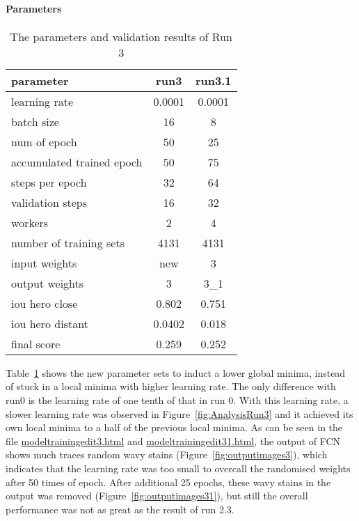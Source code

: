 \documentclass[paper=a4, fontsize=11pt]{scrartcl} %
\numberwithin{equation}{section} %
\numberwithin{figure}{section} %
\numberwithin{table}{section} %
\begin{document}
\begin{enumerate}
\begin{itemize}
{\paragraph{Parameters}\label{rubric22}
\begin{table}
	\begin{center}
		\begin{tabular}{ l | c | c }
		\hline
		parameter & run3 & run3.1 \\ \hline
		learning rate & 0.0001 & 0.0001 \\ \hline
		batch size    & 16 & 8 \\ \hline
		num of epoch  & 50 & 25 \\ \hline
		accumulated trained epoch & 50 & 75 \\ \hline
		steps per epoch & 32 & 64 \\ \hline
		validation steps & 16 & 32 \\ \hline
		workers & 2 & 4  \\ \hline
		number of training sets & 4131 & 4131 \\ \hline
		input weights & new & 3 \\ \hline
		output weights & 3 & 3\_1\\ 		
		\hline \hline
		iou hero close &0.802 & 0.751 \\ \hline	  
		iou hero distant & 0.0402 & 0.018 \\ \hline
		final score & 0.259& 0.252 \\
		\hline
		\end{tabular}
		\caption{The parameters and validation results of Run 3}
		\label{tab:parameters3}
	\end{center}
\end{table}

Table~\ref{tab:parameters3} shows the new parameter sets to induct a lower global minima, instead of stuck in a local minima with higher learning rate. The only difference with run0 is the learning rate of one tenth of that in run 0. 
With this learning rate, a slower learning rate was observed in Figure~\ref{fig:AnalysisRun3} and it achieved its own local minima to a half of the previous local minima. As can be seen in the file \href{run:./JupyterNotebooks/modeltrainingedit3.html}{modeltrainingedit3.html} and \href{run:./JupyterNotebooks/modeltrainingedit31.html}{modeltrainingedit31.html}, the output of FCN shows much traces random wavy stains (Figure~\ref{fig:outputimages3}), which indicates that the learning rate was too small to overcall the randomised weights after 50 times of epoch. After additional 25 epochs, these wavy stains in the output was removed (Figure~\ref{fig:outputimages31}), but still the overall performance was not as great as the result of run 2.3.

}
\end{itemize}
\end{enumerate}
\end{document}
